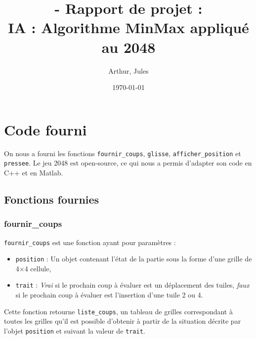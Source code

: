 \documentclass[a4paper]{report}
\title{\bsc{Data Sciences} - Rapport de projet :\\ IA : Algorithme MinMax appliqué au 2048}
\author{\bsc{Langlard} Arthur, \bsc{Marcone} Jules}
\date{\today}
\begin{document}




\maketitle

\chapter{Code fourni}
On nous a fourni les fonctions \verb|fournir_coups|, \verb|glisse|, \verb|afficher_position| et \verb|pressee|.
Le jeu 2048 est open-source, ce qui nous a permis d'adapter son code en C++ et en Matlab.

\section{Fonctions fournies}
\subsection{fournir\_coups}
\verb|fournir_coups| est une fonction ayant pour paramètres : 
\begin{itemize}
\item \verb|position| : Un objet contenant l'état de la partie sous la forme d'une grille de 4$\times$4 cellule,
\item \verb|trait| : \emph{Vrai} si le prochain coup à évaluer est un déplacement des tuiles, \emph{faux} si le prochain coup à évaluer est l'insertion d'une tuile 2 ou 4.
\end{itemize}
Cette fonction retourne \verb|liste_coups|, un tableau de grilles correspondant à toutes les grilles qu'il est possible d'obtenir à partir de la situation décrite par l'objet \verb|position| et suivant la valeur de \verb|trait|.
\end{document}
